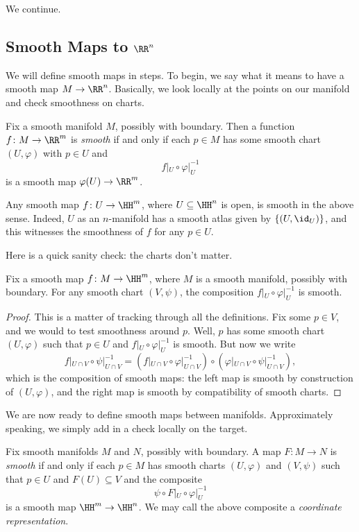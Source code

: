 \documentclass[../notes.tex]{subfiles}
\begin{document}
We continue.

\subsection{Smooth Maps to \texorpdfstring{$\RR^n$}{ Rn}}
We will define smooth maps in steps. To begin, we say what it means to have a smooth map $M\to\RR^n$. Basically, we look locally at the points on our manifold and check smoothness on charts.
\begin{definition}[smooth]
	Fix a smooth manifold $M$, possibly with boundary. Then a function $f\colon M\to\RR^m$ is \textit{smooth} if and only if each $p\in M$ has some smooth chart $(U,\varphi)$ with $p\in U$ and
	\[f|_U\circ\varphi|_U^{-1}\]
	is a smooth map $\varphi(U)\to\RR^m$.
\end{definition}
\begin{example}
	Any smooth map $f\colon U\to\HH^m$, where $U\subseteq\HH^n$ is open, is smooth in the above sense. Indeed, $U$ as an $n$-manifold has a smooth atlas given by $\{(U,{\id_U})\}$, and this witnesses the smoothness of $f$ for any $p\in U$.
\end{example}
Here is a quick sanity check: the charts don't matter.
\begin{lemma}
	Fix a smooth map $f\colon M\to\HH^m$, where $M$ is a smooth manifold, possibly with boundary. For any smooth chart $(V,\psi)$, the composition $f|_U\circ\varphi|_U^{-1}$ is smooth.
\end{lemma}
\begin{proof}
	This is a matter of tracking through all the definitions. Fix some $p\in V$, and we would to test smoothness around $p$. Well, $p$ has some smooth chart $(U,\varphi)$ such that $p\in U$ and $f|_U\circ\varphi|_U^{-1}$ is smooth. But now we write
	\[f|_{U\cap V}\circ\psi|_{U\cap V}^{-1}=\left(f|_{U\cap V}\circ\varphi|_{U\cap V}^{-1}\right)\circ\left(\varphi|_{U\cap V}\circ\psi|_{U\cap V}^{-1}\right),\]
	which is the composition of smooth maps: the left map is smooth by construction of $(U,\varphi)$, and the right map is smooth by compatibility of smooth charts.
\end{proof}
We are now ready to define smooth maps between manifolds. Approximately speaking, we simply add in a check locally on the target.
\begin{definition}[smooth]
	Fix smooth manifolds $M$ and $N$, possibly with boundary. A map $F\colon M\to N$ is \textit{smooth} if and only if each $p\in M$ has smooth charts $(U,\varphi)$ and $(V,\psi)$ such that $p\in U$ and $F(U)\subseteq V$ and the composite
	\[\psi\circ F|_U\circ\varphi|_U^{-1}\]
	is a smooth map $\HH^m\to\HH^n$. We may call the above composite a \textit{coordinate representation}.
\end{definition}
\end{document}
